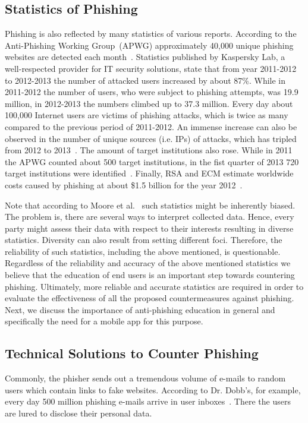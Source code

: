 \subsection{Statistics of Phishing}
\label{s:stats}
Phishing is also reflected by many statistics of various reports. 
 According to the Anti-Phishing Working Group~(APWG) approximately 40,000 unique phishing websites are detected each month~\cite{antiphishingtrendreport2013}. Statistics published by Kaspersky Lab, a well-respected provider for IT security solutions, state that from year 2011-2012 to 2012-2013 the number of attacked users increased by about 87\%. While in 2011-2012 the number of users, who were subject to phishing attempts, was 19.9 million, in 2012-2013 the numbers climbed up to 37.3 million. 
 Every day about 100,000 Internet users are victims of phishing attacks, which is twice as many compared to the previous period of 2011-2012. An immense increase can also be observed in the number of unique sources (i.e. IPs) of attacks, which has tripled from 2012 to 2013~\cite{kasperskyreport2013}. The amount of target institutions also rose. 
 While in 2011 the APWG counted about 500 target institutions, in the fist quarter of 2013 720 target institutions were identified~\cite{antiphishingglobalreport2013}. 
Finally, RSA and ECM estimate worldwide costs caused by phishing at about \$1.5 billion for the year 2012~\cite{rsa2013}. 

Note that according to Moore et al.~\cite{moore2010hard} such statistics might be inherently biased. 
The problem is, there are several ways to interpret collected data. 
Hence, every party might assess their data with respect to their interests resulting in diverse statistics. 
Diversity can also result from setting different foci.
Therefore, the reliability of such statistics, including the above mentioned, is questionable. 
Regardless of the reliability and accuracy of the above mentioned statistics we believe that the education of end users is an important step towards countering phishing. 
Ultimately, more reliable and accurate statistics are required in order to evaluate the effectiveness of all the proposed countermeasures against phishing. 
Next, we discuss the importance of anti-phishing education in general and specifically the need for a mobile app for this purpose.
\subsection{Technical Solutions to Counter Phishing}
Commonly, the phisher sends out a tremendous volume of e-mails to random users which contain links to fake websites.
According to Dr. Dobb's, for example, every day 500 million phishing e-mails arrive in user inboxes~\cite{drdobb2012email}.
 There the users are lured to disclose their personal data.

